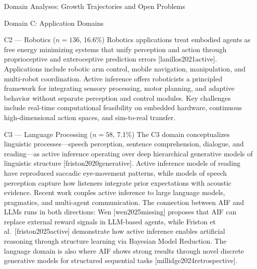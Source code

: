 \documentclass[
  ignorenonframetext,
]{beamer}
\providecommand{\citep}[1]{[#1]}
\begin{document}
\begin{frame}[allowframebreaks]{Domain Analyses: Growth Trajectories and
Open Problems \label{sec:subfield_analyses}}
\begin{block}{Domain C: Application Domains}
\begin{block}{C2 --- Robotics (\(n = 136\), 16.6\%)}
\protect{}\label{c2-robotics-n-136-16.6}
Robotics applications treat embodied agents as free energy minimizing
systems that unify perception and action through proprioceptive and
exteroceptive prediction errors \citep{lanillos2021active}. Applications
include robotic arm control, mobile navigation, manipulation, and
multi-robot coordination. Active inference offers roboticists a
principled framework for integrating sensory processing, motor planning,
and adaptive behavior without separate perception and control modules.
Key challenges include real-time computational feasibility on embedded
hardware, continuous high-dimensional action spaces, and sim-to-real
transfer.
\end{block}

\begin{block}{C3 --- Language Processing (\(n = 58\), 7.1\%)}
\protect{}\label{c3-language-processing-n-58-7.1}
The C3 domain conceptualizes linguistic processes---speech perception,
sentence comprehension, dialogue, and reading---as active inference
operating over deep hierarchical generative models of linguistic
structure \citep{friston2020generative}. Active inference models of
reading have reproduced saccadic eye-movement patterns, while models of
speech perception capture how listeners integrate prior expectations
with acoustic evidence. Recent work couples active inference to large
language models, pragmatics, and multi-agent communication. The
connection between AIF and LLMs runs in both directions: Wen
\citep{wen2025missing} proposes that AIF can replace external reward
signals in LLM-based agents, while Friston et
al.~\citep{friston2025active} demonstrate how active inference enables
artificial reasoning through structure learning via Bayesian Model
Reduction. The language domain is also where AIF shows strong results
through novel discrete generative models for structured sequential tasks
\citep{millidge2024retrospective}.
\end{block}


\end{block}
\end{frame}
\end{document}
